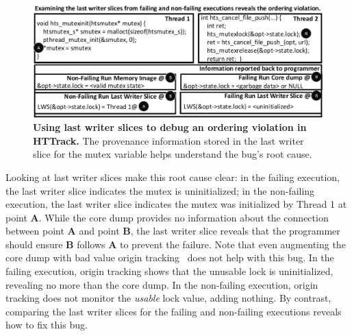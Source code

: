 \documentclass[preprint,9pt]{sigplanconf}
\begin{document}
\begin{figure}[h]
\centering
\includegraphics[width=\columnwidth]{figs/LWSHTTDebug.pdf}
\caption{\label{fig:httlws}{\bf Using last writer slices to debug an
ordering violation in HTTrack.} The provenance information stored in the last
writer slice for the mutex variable helps understand the bug's root cause.}
\end{figure}

Looking at last writer slices make this root cause clear: in the failing
execution, the last writer slice indicates the mutex is uninitialized; in the
non-failing execution, the last writer slice indicates the mutex was
initialized by Thread 1 at point {\bf A}. While the core dump provides no
information about the connection between point {\bf A} and point {\bf B}, the
last writer slice reveals that the programmer should ensure {\bf B} follows
{\bf A} to prevent the failure.  Note that even augmenting the core dump with
bad value origin tracking~\cite{badapples} does not help with this bug.  In the
failing execution, origin tracking shows that the unusable lock is
uninitialized, revealing no more than the core dump.  In the non-failing
execution, origin tracking does not monitor the {\em usable} lock value, adding
nothing.  By contrast, comparing the last writer slices for the failing and
non-failing executions reveals how to fix this bug.  




%
%
\end{document}
